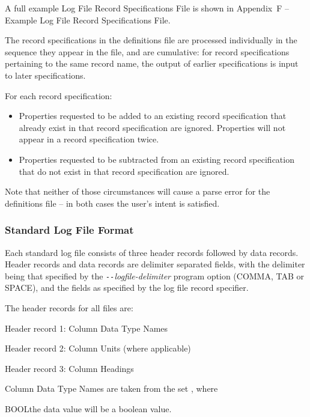 \normalsize

\bigskip 
A full example Log File Record Specifications File is shown in Appendix~F -- Example Log File Record Specifications File.

The record specifications in the definitions file are processed individually in the sequence they appear in the file, and are cumulative: for record specifications pertaining to the same record name, the output of earlier specifications is input to later specifications.

\newpage
For each record specification:

\begin{itemize}
\item  Properties requested to be added to an existing record specification that already exist in that record specification are ignored.  Properties will not appear in a record specification twice.
\item  Properties requested to be subtracted from an existing record specification that do not exist in that record specification are ignored.
\end{itemize}

Note that neither of those circumstances will cause a parse error for the definitions file -- in both cases the user's intent is satisfied.

\newpage
\subsubsection{Standard Log File Format}\label{sec:StandardLogFileFormat}

Each standard log file consists of three header records followed by data records.  Header records and data records are delimiter separated fields, with the delimiter being that specified by the \textit{\texttt{-{}-}logfile-delimiter} program option (COMMA, TAB or SPACE), and the fields as specified by the log file record specifier.

The header records for all files are:

\tabto{3em}Header record 1: Column Data Type Names\par
\tabto{3em}Header record 2: Column Units (where applicable)\par
\tabto{3em}Header record 3: Column Headings

\bigskip
Column Data Type Names are taken from the set , where

\tabto{3em}BOOL\tabto{7.5em}the data value will be a boolean value.

